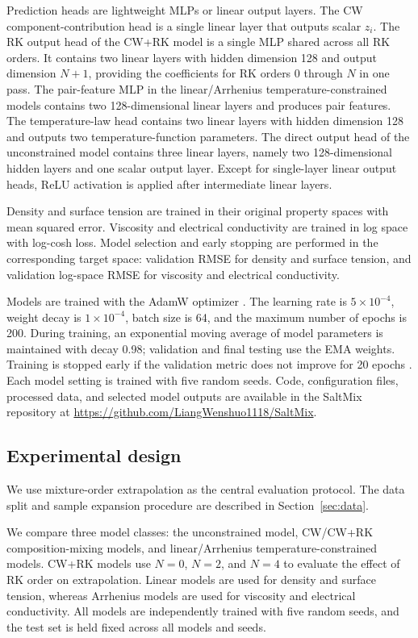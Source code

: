 \documentclass[journal=jctcce,manuscript=article,doi=true]{achemso}
\begin{document}
Prediction heads are lightweight MLPs or linear output layers. The CW component-contribution head is a single linear layer that outputs scalar \(z_i\). The RK output head of the CW+RK model is a single MLP shared across all RK orders. It contains two linear layers with hidden dimension 128 and output dimension \(N+1\), providing the coefficients for RK orders 0 through \(N\) in one pass. The pair-feature MLP in the linear/Arrhenius temperature-constrained models contains two 128-dimensional linear layers and produces pair features. The temperature-law head contains two linear layers with hidden dimension 128 and outputs two temperature-function parameters. The direct output head of the unconstrained model contains three linear layers, namely two 128-dimensional hidden layers and one scalar output layer. Except for single-layer linear output heads, ReLU activation is applied after intermediate linear layers.

Density and surface tension are trained in their original property spaces with mean squared error. Viscosity and electrical conductivity are trained in log space with log-cosh loss. Model selection and early stopping are performed in the corresponding target space: validation RMSE for density and surface tension, and validation log-space RMSE for viscosity and electrical conductivity.

Models are trained with the AdamW optimizer \cite{loshchilov2019decoupled,kingma2015adam}. The learning rate is \(5\times10^{-4}\), weight decay is \(1\times10^{-4}\), batch size is 64, and the maximum number of epochs is 200. During training, an exponential moving average of model parameters is maintained with decay 0.98; validation and final testing use the EMA weights. Training is stopped early if the validation metric does not improve for 20 epochs \cite{prechelt1998early}. Each model setting is trained with five random seeds. Code, configuration files, processed data, and selected model outputs are available in the SaltMix repository at \url{https://github.com/LiangWenshuo1118/SaltMix}.

\subsection{Experimental design}\label{sec:experimental-design}

We use mixture-order extrapolation as the central evaluation protocol. The data split and sample expansion procedure are described in Section~\ref{sec:data}.

We compare three model classes: the unconstrained model, CW/CW+RK composition-mixing models, and linear/Arrhenius temperature-constrained models. CW+RK models use \(N=0\), \(N=2\), and \(N=4\) to evaluate the effect of RK order on extrapolation. Linear models are used for density and surface tension, whereas Arrhenius models are used for viscosity and electrical conductivity. All models are independently trained with five random seeds, and the test set is held fixed across all models and seeds.
\end{document}
